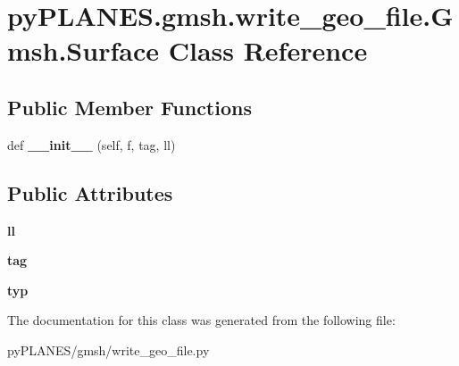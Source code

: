 \hypertarget{classpy_p_l_a_n_e_s_1_1gmsh_1_1write__geo__file_1_1_gmsh_1_1_surface}{}\section{py\+P\+L\+A\+N\+E\+S.\+gmsh.\+write\+\_\+geo\+\_\+file.\+Gmsh.\+Surface Class Reference}
\label{classpy_p_l_a_n_e_s_1_1gmsh_1_1write__geo__file_1_1_gmsh_1_1_surface}
\subsection*{Public Member Functions}
\begin{DoxyCompactItemize}
\item 
\mbox{\label{classpy_p_l_a_n_e_s_1_1gmsh_1_1write__geo__file_1_1_gmsh_1_1_surface_ad4edc24353b60a511eb5ea716d5e0e8f}} 
def {\bfseries \+\_\+\+\_\+init\+\_\+\+\_\+} (self, f, tag, ll)
\end{DoxyCompactItemize}
\subsection*{Public Attributes}
\begin{DoxyCompactItemize}
\item 
\mbox{\label{classpy_p_l_a_n_e_s_1_1gmsh_1_1write__geo__file_1_1_gmsh_1_1_surface_a737f308b622e686ad3eb5946426996a4}} 
{\bfseries ll}
\item 
\mbox{\label{classpy_p_l_a_n_e_s_1_1gmsh_1_1write__geo__file_1_1_gmsh_1_1_surface_a30121a4663da81cf268d92b15420fc00}} 
{\bfseries tag}
\item 
\mbox{\label{classpy_p_l_a_n_e_s_1_1gmsh_1_1write__geo__file_1_1_gmsh_1_1_surface_a24c08ac3516de66fe3fd053021ed91dd}} 
{\bfseries typ}
\end{DoxyCompactItemize}


The documentation for this class was generated from the following file\+:\begin{DoxyCompactItemize}
\item 
py\+P\+L\+A\+N\+E\+S/gmsh/write\+\_\+geo\+\_\+file.\+py\end{DoxyCompactItemize}
